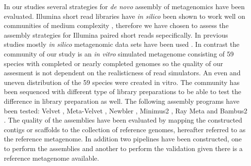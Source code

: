\documentclass[a4paper,12pt]{report}
\begin{document}

In our studies several strategies for {\em de novo} assembly of metagenomics
have been evaluated. Illumina short read libraries have {\em in silico} been
shown to work well on communities of medium complexity \cite{Mende22384016},
therefore we have chosen to assess the assembly strategies for Illumina paired
short reads sepecifically. In previous studies mostly {\em in silico}
metagenomic data sets have been used
\cite{Pignatelli21625384,Mavromatis17468765}. In contrast the community of our
study is an {\em in vitro} simulated metagenome consisting of 59 species with
completed or nearly completed genomes so the quality of our assesment is not
dependent on the realisticness of read simulators. An even and uneven
distribution of the 59 species were created in vitro. The community has been
sequenced with different type of library preparations to be able to test the
difference in library preparation as well.  The following assembly programs
have been tested: Velvet \cite{Zerbino18349386}, Meta-Velvet \cite{MetaVelvet},
Newbler \cite{Quinn18755037}, Minimus2 \cite{Sommer17324286}, Ray Meta
\cite{Boisvert23259615} and Bambus2 \cite{Koren21926123}. The quality of the
assemblies have been evaluated by mapping the constructed contigs or scaffolds
to the collection of reference genomes, hereafter referred to as the reference
metagenome. In addition two pipelines have been constructed, one to perform the
assemblies and another to perform the validation given there is a reference
metagenome available.

%
%
\end{document}
